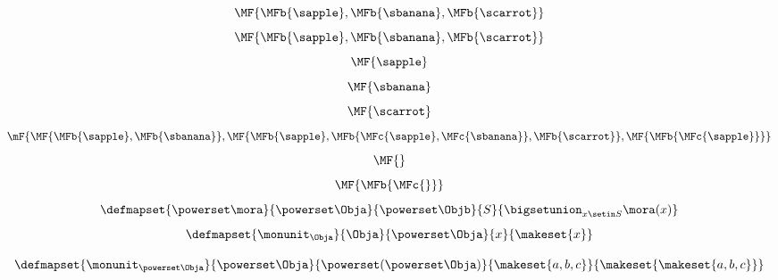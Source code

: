 {\begin{forslides}
    \begin{equation}
        \label{eq:fruit-sum-14}
        \MF{\MFb{\sapple}   ,  \MFb{\sbanana}  ,  \MFb{\scarrot}}
    \end{equation}
    \begin{equation}
        \label{eq:fruit-sum-15}
        \MF{\MFb{\sapple}  ,  \MFb{\sbanana}  ,  \MFb{\scarrot}}
    \end{equation}
    \begin{equation}
        \label{eq:fruit-sum-16}
        \MF{\sapple}
    \end{equation}
    \begin{equation}
        \label{eq:fruit-sum-17}
        \MF{\sbanana}
    \end{equation}
    \begin{equation}
        \label{eq:fruit-sum-18}
        \MF{\scarrot}
    \end{equation}
    \begin{equation}
        \label{eq:fruit-sum-20}
        \mF{
            \MF{\MFb{\sapple}  , \MFb{\sbanana}},
            \MF{\MFb{\sapple}   , \MFb{\MFc{\sapple}, \MFc{\sbanana}} ,  \MFb{\scarrot}},
            \MF{\MFb{\MFc{\sapple}}}
        }
    \end{equation}
    \begin{equation}
        \label{eq:fruit-sum-21-empty}
        \MF{}
    \end{equation}
    \begin{equation}
        \label{eq:fruit-sum-22-empty}
        \MF{\MFb{\MFc{}}}
    \end{equation}
    \begin{equation}
        \label{eq:monad-power-functor}
        \defmapset{
            \powerset \mora
        }{
            \powerset \Obja
        }{
            \powerset \Objb
        }{
            S
        }{
            \bigsetunion_{x\setin S} \mora(x)
        }
    \end{equation}
    \begin{equation}
        \label{eq:monad-power-monunit}
        \defmapset{
            \monunit_\Obja
        }{
            \Obja
        }{
            \powerset\Obja
        }{
            x
        }{
            \makeset{ x }
        }
    \end{equation}

    \begin{equation}
        \label{eq:monad-power-monunit-power}
        \defmapset{
            \monunit_{\powerset \Obja}
        }{
            \powerset \Obja
        }{
            \powerset (\powerset\Obja)
        }{
            \makeset{a, b, c}
        }{
            \makeset{ \makeset{a, b, c } }
        }
    \end{equation}


\end{forslides}}

